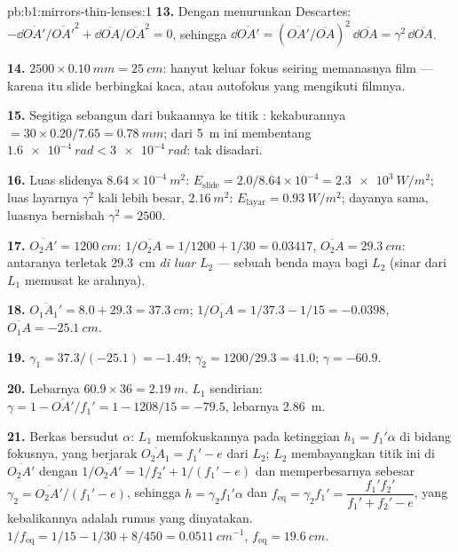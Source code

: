 \begin{solution}{pb:b1:mirrors-thin-lenses:1}
\textbf{13.} Dengan menurunkan Descartes: $-\dd\overline{OA'}/\overline{OA'}^2
+ \dd\overline{OA}/\overline{OA}^2 = 0$, sehingga $\dd\overline{OA'} =
(\overline{OA'}/\overline{OA})^2\,\dd\overline{OA} = \gamma^2\,\dd\overline{OA}$.

\textbf{14.} $2500 \times \qty{0.10}{mm} = \qty{25}{cm}$: 
hanyut keluar fokus seiring memanasnya film --- karena itu slide berbingkai
kaca, atau autofokus yang mengikuti filmnya.

\textbf{15.} Segitiga sebangun dari bukaannya ke titik :
kekaburannya $= 30 \times 0.20/7.65 = \qty{0.78}{mm}$; dari \qty{5}{m} ini
membentang $\qty{1.6e-4}{rad} < \qty{3e-4}{rad}$: tak disadari.

\textbf{16.} Luas slidenya $8.64\times10^{-4}\ \unit{m^2}$: $E_{\text{slide}}
= 2.0/8.64\times10^{-4} = \qty{2.3e3}{W/m^2}$; luas layarnya $\gamma^2$
kali lebih besar, $\qty{2.16}{m^2}$: $E_{\text{layar}} = \qty{0.93}{W/m^2}$;
dayanya sama, luasnya bernisbah $\gamma^2 = 2500$.

\textbf{17.} $\overline{O_2A'} = \qty{1200}{cm}$: $1/\overline{O_2A} =
1/1200 + 1/30 = 0.03417$, $\overline{O_2A} = \qty{+29.3}{cm}$: 
antaranya terletak \qty{29.3}{cm} \emph{di luar} $L_2$ --- sebuah benda
maya bagi $L_2$ (sinar dari $L_1$ memusat ke arahnya).

\textbf{18.} $\overline{O_1A_1'} = 8.0 + 29.3 = \qty{37.3}{cm}$;
$1/\overline{O_1A} = 1/37.3 - 1/15 = -0.0398$, $\overline{O_1A} =
\qty{-25.1}{cm}$.

\textbf{19.} $\gamma_1 = 37.3/(-25.1) = -1.49$; $\gamma_2 = 1200/29.3 =
41.0$; $\gamma = -60.9$.

\textbf{20.} Lebarnya $60.9 \times 36 = \qty{2.19}{m}$. $L_1$ sendirian:
$\gamma = 1 - \overline{OA'}/f_1' = 1 - 1208/15 = -79.5$, lebarnya
\qty{2.86}{m}.

\textbf{21.} Berkas bersudut $\alpha$: $L_1$ memfokuskannya pada ketinggian $h_1 = f_1'\alpha$
di bidang fokusnya, yang berjarak $\overline{O_2A_1} = f_1' - e$ dari $L_2$;
$L_2$ membayangkan titik ini di $\overline{O_2A'}$ dengan $1/\overline{O_2A'}
= 1/f_2' + 1/(f_1' - e)$ dan memperbesarnya sebesar $\gamma_2 = \overline{O_2A'}/(f_1'
- e)$, sehingga $h = \gamma_2 f_1'\alpha$ dan $f_{\mathrm{eq}} = \gamma_2 f_1'
= \dfrac{f_1' f_2'}{f_1' + f_2' - e}$, yang kebalikannya adalah rumus
yang dinyatakan. $1/f_{\mathrm{eq}} = 1/15 - 1/30 + 8/450 = \qty{0.0511}{cm^{-1}}$,
$f_{\mathrm{eq}} = \qty{19.6}{cm}$.


\end{solution}
